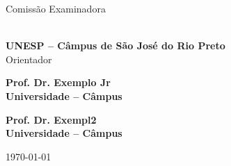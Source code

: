 	\begin{folhadeaprovacao}
	
	\begin{center}
		{\ABNTEXchapterfont\Large\imprimirautor}
		
		\vspace*{\fill}\vspace*{\fill}
		\begin{center}
			\ABNTEXchapterfont\LARGE\imprimirtitulo
		\end{center}
		\vspace*{\fill}
		
		\hspace{.45\textwidth}
			\begin{minipage}{.5\textwidth}
				\SingleSpacing
				\ABNTEXchapterfont\large\imprimirpreambulo
			\end{minipage}%
		\vspace*{\fill}
	\end{center}

	\begin{center}
		\ABNTEXchapterfont\Large Comissão Examinadora
	\end{center}

	\ABNTEXchapterfont\large
	
	\par \noindent \textbf{\imprimirorientador \\ UNESP – Câmpus de São José do Rio Preto} \\ Orientador \\
	
	\par \noindent \textbf{Prof. Dr. Exemplo Jr \\ Universidade – Câmpus} \\
	
	\par \noindent \textbf{Prof. Dr. Exempl2 \\ Universidade – Câmpus}
	
	\ABNTEXchapterfont
	
	\begin{center}
		\vspace*{0.5cm}
		{\large\imprimirlocal}
		\par
		{\large\today}
		\vspace*{1cm}
	\end{center}
\end{folhadeaprovacao}
